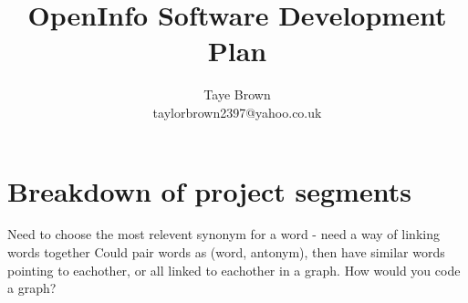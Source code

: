 \documentclass{article}
\title{OpenInfo Software Development Plan}
\author{Taye Brown \\ taylorbrown2397@yahoo.co.uk}
\begin{document}
\maketitle

\section{Breakdown of project segments}

Need to choose the most relevent synonym for a word - need a way of linking words together
Could pair words as (word, antonym), then have similar words pointing to eachother, or all linked to eachother in a graph.
How would you code a graph? 
\end{document}
